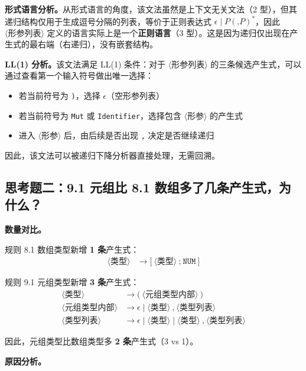 \documentclass[12pt,a4paper]{ctexart}
\begin{document}
\textbf{形式语言分析。}从形式语言的角度，该文法虽然是上下文无关文法（2 型），但其递归结构仅用于生成逗号分隔的列表，等价于正则表达式 $\epsilon \mid P(\texttt{,}P)^*$，因此 $\langle\text{形参列表}\rangle$ 定义的语言实际上是一个\textbf{正则语言}（3 型）。这是因为递归仅出现在产生式的最右端（右递归），没有嵌套结构。

\textbf{LL(1) 分析。}该文法满足 LL(1) 条件：对于 $\langle\text{形参列表}\rangle$ 的三条候选产生式，可以通过查看第一个输入符号做出唯一选择：
\begin{itemize}
    \item 若当前符号为 \texttt{)}，选择 $\epsilon$（空形参列表）
    \item 若当前符号为 \texttt{Mut} 或 \texttt{Identifier}，选择包含 $\langle\text{形参}\rangle$ 的产生式
    \item 进入 $\langle\text{形参}\rangle$ 后，由后续是否出现 \texttt{,} 决定是否继续递归
\end{itemize}

因此，该文法可以被递归下降分析器直接处理，无需回溯。

\subsection{思考题二：9.1 元组比 8.1 数组多了几条产生式，为什么？}

\textbf{数量对比。}

规则 8.1 数组类型新增 \textbf{1 条}产生式：
\begin{align}
\langle\text{类型}\rangle &\rightarrow \texttt{[} \ \langle\text{类型}\rangle \ \texttt{;} \ \texttt{NUM} \ \texttt{]}
\end{align}

规则 9.1 元组类型新增 \textbf{3 条}产生式：
\begin{align}
\langle\text{类型}\rangle &\rightarrow \texttt{(} \ \langle\text{元组类型内部}\rangle \ \texttt{)} \\
\langle\text{元组类型内部}\rangle &\rightarrow \epsilon \mid \langle\text{类型}\rangle \ \texttt{,} \ \langle\text{类型列表}\rangle \\
\langle\text{类型列表}\rangle &\rightarrow \epsilon \mid \langle\text{类型}\rangle \mid \langle\text{类型}\rangle \ \texttt{,} \ \langle\text{类型列表}\rangle
\end{align}

因此，元组类型比数组类型多 \textbf{2 条}产生式（3 vs 1）。

\textbf{原因分析。}
\end{document}
